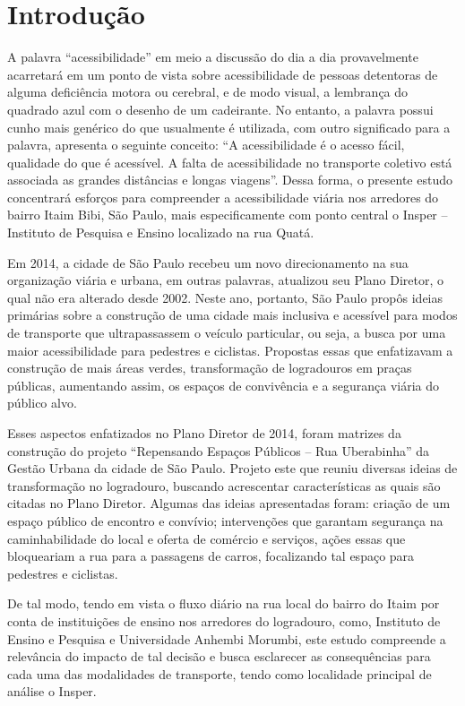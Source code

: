 \section{Introdução}

A palavra ``acessibilidade'' em meio a discussão do dia a dia provavelmente acarretará em um ponto de vista sobre acessibilidade de pessoas detentoras de alguma deficiência motora ou cerebral, e de modo visual, a lembrança do quadrado azul com o desenho de um cadeirante. No entanto, a palavra possui cunho mais genérico do que usualmente é utilizada, com outro significado para a palavra, \textcite{vieira2006} apresenta o seguinte conceito: “A acessibilidade é o acesso fácil, qualidade do que é acessível. A falta de acessibilidade no transporte coletivo está associada as grandes distâncias e longas viagens”. Dessa forma, o presente estudo concentrará esforços para compreender a acessibilidade viária nos arredores do bairro Itaim Bibi, São Paulo, mais especificamente com ponto central o Insper – Instituto de Pesquisa e Ensino localizado na rua Quatá.

Em 2014, a cidade de São Paulo recebeu um novo direcionamento na sua organização viária e urbana, em outras palavras, atualizou seu Plano Diretor, o qual não era alterado desde 2002. Neste ano, portanto, São Paulo propôs ideias primárias sobre a construção de uma cidade mais inclusiva e acessível para modos de transporte que ultrapassassem o veículo particular, ou seja, a busca por uma maior acessibilidade para pedestres e ciclistas. Propostas essas que enfatizavam a construção de mais áreas verdes, transformação de logradouros em praças públicas, aumentando assim, os espaços de convivência e a segurança viária do público alvo. 

Esses aspectos enfatizados no Plano Diretor de 2014, foram matrizes da construção do projeto “Repensando Espaços Públicos – Rua Uberabinha” da Gestão Urbana da cidade de São Paulo. Projeto este que reuniu diversas ideias de transformação no logradouro, buscando acrescentar características as quais são citadas no Plano Diretor. Algumas das ideias apresentadas foram: criação de um espaço público de encontro e convívio; intervenções que garantam segurança na caminhabilidade do local e oferta de comércio e serviços, ações essas que bloqueariam a rua para a passagens de carros, focalizando tal espaço para pedestres e ciclistas.

De tal modo, tendo em vista o fluxo diário na rua local do bairro do Itaim por conta de instituições de ensino nos arredores do logradouro, como, Instituto de Ensino e Pesquisa e Universidade Anhembi Morumbi, este estudo compreende a relevância do impacto de tal decisão e busca esclarecer as consequências para cada uma das modalidades de transporte, tendo como localidade principal de análise o Insper.


